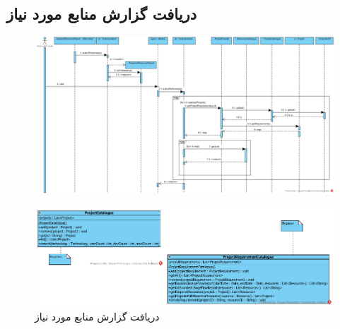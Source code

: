 \begin{landscape}
\section{دریافت گزارش منابع مورد نیاز}
\begin{figure}[H]
	\centering
	\includegraphics[scale=0.6]{img/sequence-design/RequiredResourcesReport}
\end{figure}
\begin{figure}[H]
	\centering
	\includegraphics[scale=0.7]{img/sequence-design/RequiredResourcesReportC}
	\caption{دریافت گزارش منابع مورد نیاز}
\end{figure}

\newpage

\end{landscape}
